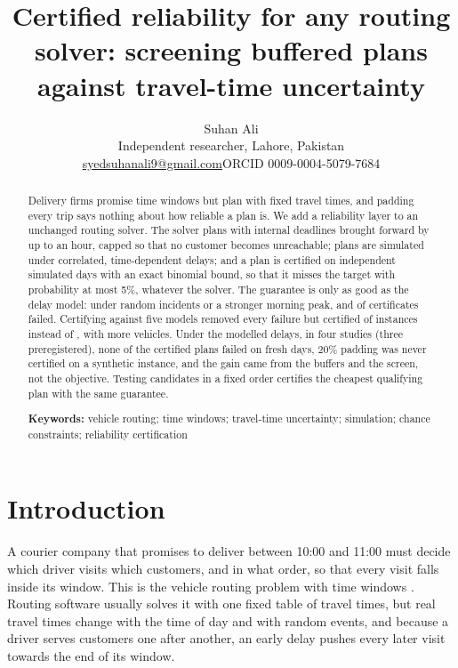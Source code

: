\documentclass[11pt,a4paper]{article}
\title{Certified reliability for any routing solver: screening buffered plans
against travel-time uncertainty}
\author{}
\author{Suhan Ali\\[2pt]
\small Independent researcher, Lahore, Pakistan\\
\small \href{mailto:syedsuhanali9@gmail.com}{syedsuhanali9@gmail.com}\quad ORCID 0009-0004-5079-7684}
\date{}
\theoremstyle{remark}
\begin{document}
\maketitle
\onehalfspacing

\begin{abstract}
\noindent Delivery firms promise time windows but plan with fixed travel times, and
padding every trip says nothing about how reliable a plan is. We add a reliability
layer to an unchanged routing solver. The solver plans
with internal deadlines brought forward by up to an hour, capped so that no customer
becomes unreachable; plans are simulated under correlated, time-dependent delays; and
a plan is certified on independent simulated days with an exact binomial bound, so
that it misses the target with probability at most 5\%, whatever the solver. The
guarantee is only as good as the delay model: under random incidents or a stronger
morning peak, \WrIncFailed{} and \WrPeakFailed{} of \WrIncCert{} certificates failed.
Certifying against five models removed every failure but certified \StOStress{} of
\StOInst{} instances instead of \StOSingle{}, with \StOFleet{} more vehicles. Under the
modelled delays, in four studies (three preregistered), none of the \CertTotal{}
certified plans failed on fresh days, 20\% padding was never certified on a synthetic
instance, and the gain came from the buffers and the screen, not the objective.
Testing candidates in a fixed order certifies the cheapest qualifying plan with the
same guarantee.

\medskip\noindent\textbf{Keywords:} vehicle routing; time windows; travel-time
uncertainty; simulation; chance constraints; reliability certification
\end{abstract}

\section{Introduction}

A courier company that promises to deliver between 10:00 and 11:00 must decide
which driver visits which customers, and in what order, so that every visit falls
inside its window. This is the vehicle routing problem with time windows
\citep[VRPTW;][]{solomon1987,toth2014}. Routing software usually solves it with one
fixed table of travel times, but real travel times change with the time of day and
with random events, and because a driver serves customers one after another, an
early delay pushes every later visit towards the end of its window.
\end{document}
